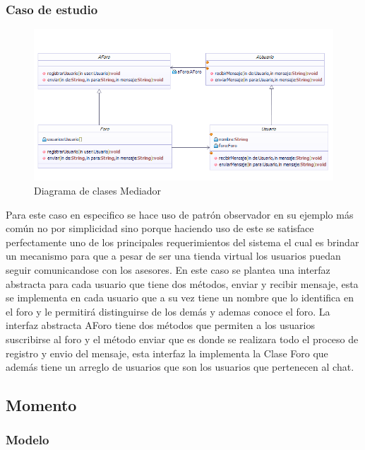 \subsubsection{Caso de estudio}

\begin{figure}[th!]
	\centering
	\includegraphics[width=1\linewidth]{arquitectura/imagenes/DiagramaMediator}
	\caption{Diagrama de clases Mediador}
\end{figure}

Para este caso en especifico se hace uso de patrón observador en su ejemplo más común no por simplicidad sino porque haciendo uso de este se satisface perfectamente uno de los principales requerimientos del sistema el cual es brindar un mecanismo para que a pesar de ser una tienda virtual los usuarios puedan seguir comunicandose con los asesores. \newline
En este caso se plantea una interfaz abstracta para cada usuario que tiene dos métodos, enviar y recibir mensaje, esta se implementa en cada usuario que a su vez tiene un nombre que lo identifica en el foro y le permitirá distinguirse de los demás y ademas conoce el foro. La interfaz abstracta AForo tiene dos métodos que permiten a los usuarios suscribirse al foro y el método enviar que es donde se realizara todo el proceso de registro y envio del mensaje, esta interfaz la implementa la Clase Foro que además tiene un arreglo de usuarios que son los usuarios que pertenecen al chat.

\newpage

\subsection{Momento}
\subsubsection{Modelo}
\newpage
